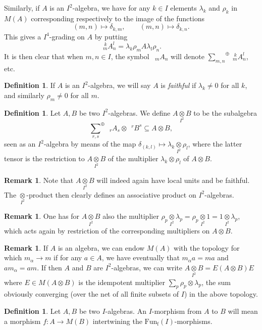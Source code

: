 \documentclass[12pt]{article}
\theoremstyle{change}
\DeclareMathOperator{\fin}{\mathrm{f}}
\newcommand{\Gr}[5]{\;{}^{\;#2}_{#4}#1_{#5}^{#3}}%
\newcommand{\Gru}[3]{\;{}^{\;#2}#1^{#3}}
\newcommand{\Grd}[3]{\;{}_{\;#2}#1_{#3}}
\newcommand{\Fun}{\mathrm{Fun}}
\newcommand{\itimes}{\underset{I^2}{\otimes}}
\newcommand{\osum}[1]{\underset{#1}{\sum}^{\oplus}}
\theoremstyle{definition}
\newtheorem{Def}[Theorem]{Definition}
\newtheorem{Rem}[Theorem]{Remark}
\numberwithin{equation}{section}
\begin{document}
Similarly, if $A$ is an $I^2$-algebra, we have for any $k\in I$ elements $\lambda_k$ and $\rho_k$ in $M(A)$ corresponding respectively to the image of the functions \[(m,n) \mapsto \delta_{k,m},\qquad (m,n)\mapsto \delta_{k,n}.\] This gives a $I^4$-grading on $A$ by putting \[\Gr{A}{k}{l}{m}{n} = \lambda_k\rho_mA\lambda_l\rho_n.\] It is then clear that when $m,n\in I$, the symbol $\Grd{A}{m}{n}$ will denote $\osum{m,n} \Gr{A}{k}{l}{m}{n}$, etc.

\begin{Def} If $A$ is an $I^2$-algebra, we will say $A$ is \emph{faithful} if $\lambda_k\neq 0$ for all $k$, and similarly $\rho_m\neq 0$ for all $m$.\end{Def}

\begin{Def} Let $A,B$ be two $I^2$-algebras. We define $A\itimes B$ to be the subalgebra \[\osum{r,s} \Grd{A}{r}{s}\otimes \Gru{B}{r}{s} \subseteq A\otimes B,\] seen as an $I^2$-algebra by means of the map $\delta_{(k,l)}\mapsto \lambda_k\itimes \rho_l$, where the latter tensor is the restriction to $A\itimes B$ of the multiplier $\lambda_k\otimes \rho_l$ of $A\otimes B$.
\end{Def}

\begin{Rem} Note that $A\itimes B$ will indeed again have local units and be faithful. The $\itimes$-product then clearly defines an associative product on $I^2$-algebras.
\end{Rem}

\begin{Rem} One has for $A\itimes B$ also the multiplier $\rho_p\itimes \lambda_p = \rho_p\itimes 1 = 1\itimes \lambda_p$, which acts again by restriction of the corresponding multipliers on $A\otimes B$.
\end{Rem}

\begin{Rem}\label{RemCut} If $A$ is an algebra, we can endow $M(A)$ with the topology for which $m_{\alpha}\rightarrow m$ if for any $a\in A$, we have eventually that $m_{\alpha}a=ma$ and $am_{\alpha}=am$. If then $A$ and $B$ are $I^2$-algebras, we can write $A\itimes B = E(A\otimes B)E$ where $E \in M(A\otimes B)$ is the idempotent multiplier $\sum_{p}\rho_p\otimes \lambda_p$, the sum obviously converging (over the net of all finite subsets of $I$) in the above topology.
\end{Rem}


\begin{Def} Let $A,B$ be two $I$-algebras. An $I$-morphism from $A$ to $B$ will mean a morphism $f:A\rightarrow M(B)$ intertwining the $\Fun_{\fin}(I)$-morphisms.
\end{Def}
\end{document}
